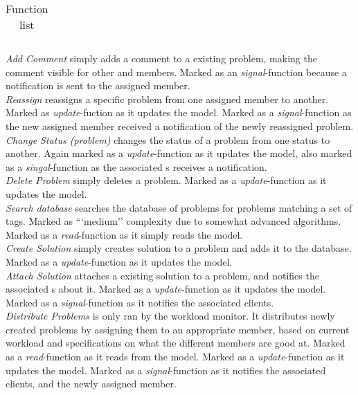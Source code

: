 \begin{table}[h]
\begin{center}
\begin{tabular}{|c|c|c|}
\end{tabular}
\end{center}
\caption{Function list}
\label{tab:functionlist}
\end{table}

\emph{Add Comment} simply adds a comment to a existing problem, making the comment visible for other \client and \astaff[] members. Marked as an \textit{signal}-function because a notification is sent to the assigned \astaff[] member.  \\
\emph{Reassign} reassigns a specific problem from one assigned \astaff[] member to another. Marked as \textit{update}-fuction as it updates the model. Marked as a \textit{signal}-function as the new assigned \astaff[] member received a notification of the newly reassigned problem. \\
\emph{Change Status (problem)} changes the status of a problem from one status to another. Again marked as a \textit{update}-function as it updates the model, also marked as a \textit{singal}-function as the associated \client s receives a notification. \\
\emph{Delete Problem} simply deletes a problem. Marked as a \textit{update}-function as it updates the model. \\
\emph{Search database} searches the database of problems for problems matching a set of tags. Marked as ```medium'' complexity due to somewhat advanced algorithms. Marked as a \textit{read}-function as it simply reads the model.\\
\emph{Create Solution} simply creates solution to a problem and adds it to the database. Marked as a \textit{update}-function as it updates the model. \\
\emph{Attach Solution} attaches a existing solution to a problem, and notifies the associated \client s about it. Marked as a \textit{update}-function as it updates the model. Marked as a \textit{signal}-function as it notifies the associated clients. \\
\emph{Distribute Problems} is only ran by the workload monitor. It distributes newly created problems by assigning them to an appropriate \astaff[] member, based on current workload and specifications on what the different \astaff[] members are good at. Marked as a \textit{read}-function as it reads from the model. Marked as a \textit{update}-function as it updates the model. Marked as a \textit{signal}-function as it notifies the associated clients, and the newly assigned \astaff[] member. \\

